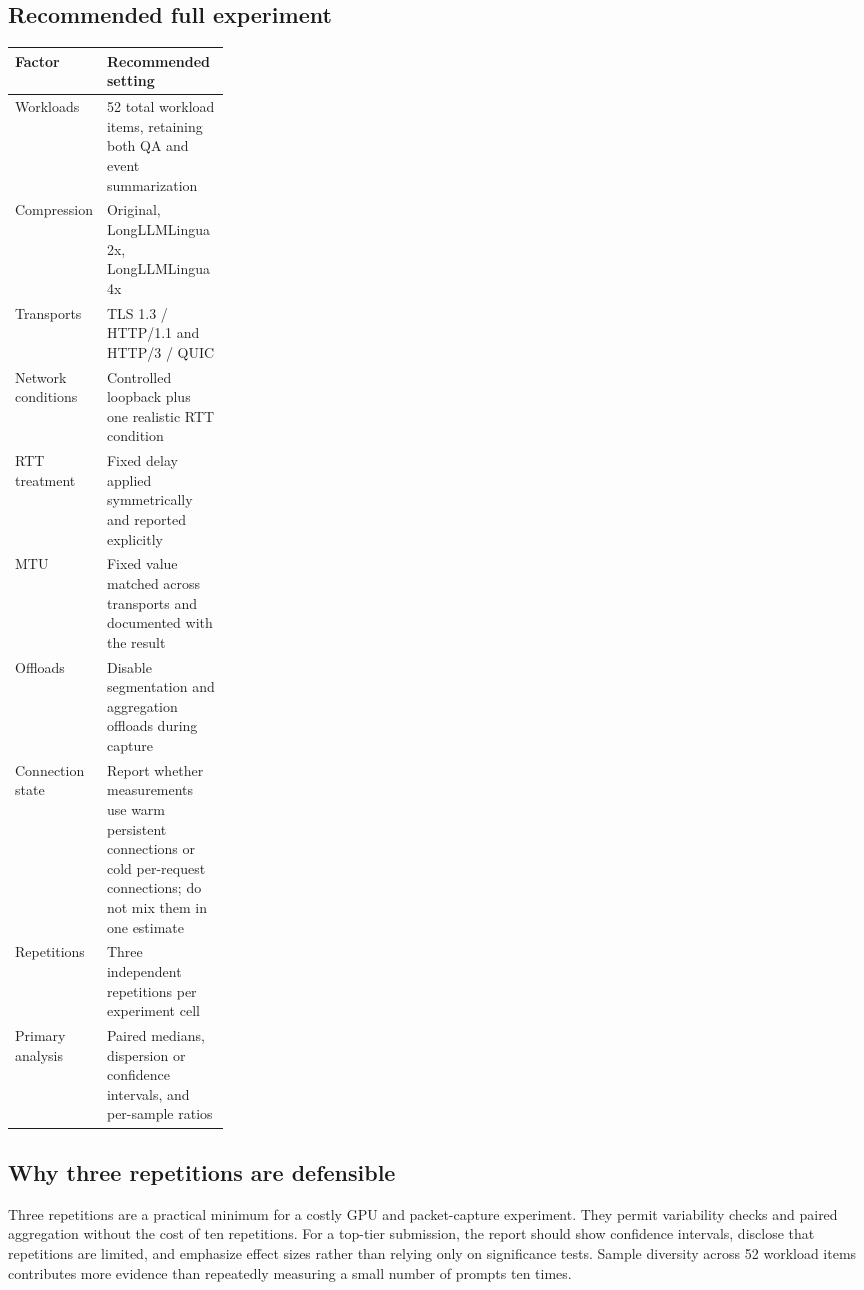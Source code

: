 \documentclass[10pt]{article}
\begin{document}
\subsection{Recommended full experiment}

\begin{center}
\renewcommand{\arraystretch}{1.25}
\begin{tabularx}{\linewidth}{@{}p{0.25\linewidth}Y@{}}
\toprule
\textbf{Factor} & \textbf{Recommended setting} \\
\midrule
Workloads & 52 total workload items, retaining both QA and event summarization \\
Compression & Original, LongLLMLingua 2x, LongLLMLingua 4x \\
Transports & TLS 1.3 / HTTP/1.1 and HTTP/3 / QUIC \\
Network conditions & Controlled loopback plus one realistic RTT condition \\
RTT treatment & Fixed delay applied symmetrically and reported explicitly \\
MTU & Fixed value matched across transports and documented with the result \\
Offloads & Disable segmentation and aggregation offloads during capture \\
Connection state & Report whether measurements use warm persistent connections
or cold per-request connections; do not mix them in one estimate \\
Repetitions & Three independent repetitions per experiment cell \\
Primary analysis & Paired medians, dispersion or confidence intervals, and
per-sample ratios \\
\bottomrule
\end{tabularx}
\end{center}

\subsection{Why three repetitions are defensible}

Three repetitions are a practical minimum for a costly GPU and packet-capture
experiment. They permit variability checks and paired aggregation without the
cost of ten repetitions. For a top-tier submission, the report should show
confidence intervals, disclose that repetitions are limited, and emphasize
effect sizes rather than relying only on significance tests. Sample diversity
across 52 workload items contributes more evidence than repeatedly measuring a
small number of prompts ten times.
\end{document}
